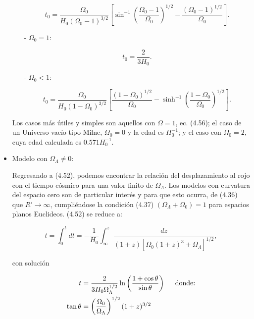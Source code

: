 \documentclass[11pt]{article}
\begin{document}
\begin{itemize}
\begin{itemize}
            \begin{equation}
	           t_0 = \frac{\Omega_0}{H_0(\Omega_0 - 1)^{3/2}} \left[ \sin^{-1} \left( \frac{ \Omega_0 - 1}{\Omega_0} \right)^{1/2} - \frac{{(\Omega_0 - 1)}^{1/2}}{\Omega_0 } \right].
            \end{equation}
            
            \item[-] $\Omega_0=1$:
            
            \begin{equation}
                t_0 = \frac{2}{3H_0}.
            \end{equation}

        \item[-] $\Omega_0<1$:
        
        \begin{equation}
       t_0 = \frac{\Omega_0}{H_0(1-\Omega_0)^{3/2}} \left[   \frac{(   1- \Omega_0)^{1/2}}{\Omega_0}  - \sinh^{-1} \left( \frac{{ 1-\Omega_0}}{\Omega_0 } \right)^{1/2} \right].
            \end{equation}
            
        \end{itemize}
        
        
        Los casos más útiles y simples son aquellos con $\Omega=1$, ec. (4.56); el caso de un Universo vacío tipo Milne, $\Omega_0 =0$ y la edad es $H_0^{-1}$; y el caso con $\Omega_0=2$, cuya edad calculada es $0.571 H_0^{-1}$. 
        
        \item Modelo con $\Omega_{\Lambda} \neq 0$:
        
        Regresando a (4.52), podemos encontrar la relación del desplazamiento al rojo con el tiempo cósmico para una valor finito de $\Omega_{\Lambda}$. Los modelos con curvatura del espacio cero son de particular interés y para que esto ocurra, de (4.36) que $R'\rightarrow{\infty}$, cumpliéndose la condición (4.37) $(\Omega_{\Lambda}  + \Omega_0) =1$ para espacios planos Euclideos. (4.52) se reduce a:
        
        \begin{equation}
             t = \int_0^t{dt} = - \frac{1}{H_0}\int_{\infty}^z{\frac{dz}{(1+z)[\Omega_0(1+z)^3+\Omega_{\Lambda}]^{1/2}}},
        \end{equation}
        
        con solución 
        
        \begin{align}
            t &= \frac{2}{3H_0\Omega_{\Lambda}^{1/2}} \ln \left(\frac{1+\cos \theta }{\sin \theta} \right)   \hspace{0.5cm} \text{donde:} \notag \\
            \tan \theta &= \left(\frac{\Omega_0}{\Omega_{\Lambda}} \right)^{1/2} (1+z)^{3/2}
        \end{align}
        

\end{itemize}
\end{document}
